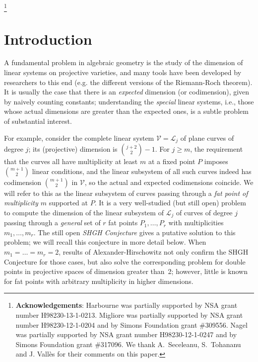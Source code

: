 \documentclass[12pt]{amsart}
\numberwithin{equation}{section}
\theoremstyle{definition}
\begin{document}
\date{February 5, 2016}

\thanks{
{\bf Acknowledgements}: Harbourne was partially supported by NSA grant number  H98230-13-1-0213.
Migliore was partially supported by NSA grant number H98230-12-1-0204 and by Simons Foundation grant \#309556.
Nagel was partially supported by NSA grant number H98230-12-1-0247 and by Simons Foundation grant \#317096.
We thank A.\ Seceleanu, S.\ Tohananu and J. Vall\`es for their comments on this paper.}



\maketitle

\section{Introduction}

A fundamental problem in algebraic geometry is the study of the dimension of linear systems on projective varieties, and many tools have been developed by researchers to this end (e.g. the different versions of the Riemann-Roch theorem). It is usually the case that there is an {\em expected} dimension (or codimension), given by naively counting constants; understanding the  {\em special} linear systems, i.e., those whose actual dimensions are greater than the expected ones, is a subtle problem of substantial interest.

For example, consider the complete linear system $\mathcal V=\mathcal L_j$ of plane curves of degree $j$; its (projective) dimension is  $\binom{j+2}{2}-1$. For $j\geq m$,  the requirement that the curves all have multiplicity at least $m$ at a fixed point $P$ imposes $\binom{m+1}{2}$ linear conditions, and the   linear subsystem of all such curves indeed has codimension $\binom{m+1}{2}$ in $\mathcal V$,  so the actual and expected codimensions coincide. We will refer to this as the  linear subsystem of curves passing through a {\em fat point of multiplicity $m$}  supported at $P$. It is a very well-studied (but still open) problem to compute the dimension of the linear subsystem of $\mathcal L_j$ of curves of degree $j$ passing through a {\em general} set of $r$ fat points $P_1,\ldots,P_r$ with multiplicities $m_1,\dots, m_r$. The still open {\em SHGH Conjecture} gives a putative solution to this problem; we will recall  this conjecture in more detail below. 
When $m_1=\ldots=m_r=2$, results of Alexander-Hirschowitz not only confirm the SHGH Conjecture for those cases, but also solve the 
corresponding problem for double points in projective spaces of dimension greater than~2; however, little is known for fat points with arbitrary multiplicity in higher dimensions. 
\end{document}
